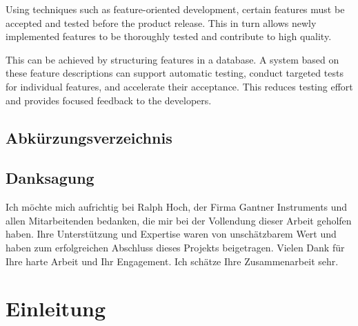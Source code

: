 \documentclass[a4paper, fontsize=11pt, parskip=half, twoside]{scrreprt}
\begin{document}
	Using techniques such as feature-oriented development, certain features must be accepted and tested before the product release. 
	This in turn allows newly implemented features to be thoroughly tested and contribute to high quality. 
	
	This can be achieved by structuring features in a database. 
	A system based on these feature descriptions can support automatic testing, conduct targeted tests for individual features, and accelerate their acceptance. 
	This reduces testing effort and provides focused feedback to the developers.
	
	\cleardoublepage   %
	\setcounter{tocdepth}{2}
	\setcounter{secnumdepth}{4}
	\tableofcontents
	
	\clearpage
	\listoffigures
	
	\clearpage
	\section*{Abkürzungsverzeichnis}
	\begin{acronym}
		
	\end{acronym}
	
	\clearpage
	\section*{Danksagung}
	Ich möchte mich aufrichtig bei Ralph Hoch, der Firma Gantner Instruments und allen Mitarbeitenden bedanken, die mir bei der Vollendung dieser Arbeit geholfen haben. 
	Ihre Unterstützung und Expertise waren von unschätzbarem Wert und haben zum erfolgreichen Abschluss dieses Projekts beigetragen. 
	Vielen Dank für Ihre harte Arbeit und Ihr Engagement. 
	Ich schätze Ihre Zusammenarbeit sehr.
	
	
	\clearpage
	\chapter{Einleitung}
	
\end{document}
